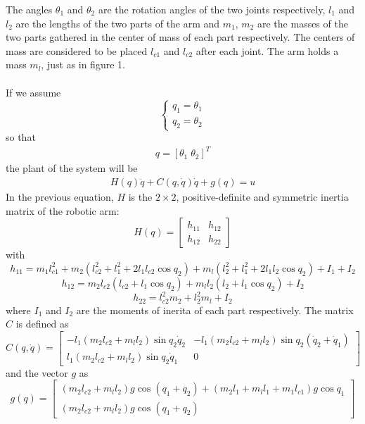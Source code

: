 \documentclass[a4paper]{article}
\newcommand\dotq{\dot{q}}
\newcommand\ddotq{\ddot{q}}
\begin{document}
\noindent\hspace{-2pt}
The angles $\theta_1$ and $\theta_2$ are the rotation angles of the two joints respectively, $l_1$ and $l_2$ are the 
lengths of the two parts of the arm and $m_1$, $m_2$ are the masses of the two parts gathered in the center of mass of 
each part respectively. The centers of mass are considered to be placed $l_{c1}$ and $l_{c2}$ after each joint. The arm 
holds a mass $m_l$, just as in figure 1. \\\\
If we assume 
$$
    \begin{cases}
        q_1 = \theta_1 \\ 
        q_2 = \theta_2
    \end{cases}
$$
so that 
\begin{align}
    q = [\theta_1 \; \theta_2]^T
\end{align}
the plant of the system will be 
\begin{align}
    H(q) \ddotq + C(q, \dotq) \dotq + g(q) = u
\end{align}
In the previous equation, $H$ is the $2 \times 2$, positive-definite and symmetric inertia matrix of the robotic arm: 
$$
    H(q) =  \begin{bmatrix}
            h_{11} & h_{12} \\
            h_{12} & h_{22}        
            \end{bmatrix}
$$
with 
$$h_{11} = m_{1} l_{c 1}^{2}+m_{2}\left(l_{c 2}^{2}+l_{1}^{2}+2 l_{1} l_{c 2} \cos q_{2}\right)+m_{l}\left(l_{2}^{2}+l_{1}^{2}+2 l_{1} l_{2} \cos q_{2}\right)+I_{1}+I_{2}$$
$$h_{12} = m_{2} l_{c 2}\left(l_{c 2}+l_{1} \cos q_{2}\right)+m_{l} l_{2}\left(l_{2}+l_{1} \cos q_{2}\right)+I_{2}$$
$$h_{22} = l_{c 2}^{2} m_{2}+l_{2}^{2} m_{l}+I_{2}$$
where $I_1$ and $I_2$ are the moments of inerita of each part respectively.
The matrix $C$ is defined as
$$C(q, \dotq) =     \begin{bmatrix}
                        -l_{1}\left(m_{2} l_{c 2}+m_{l} l_{2}\right) \sin q_{2} \dot{q}_{2} & -l_{1}\left(m_{2} l_{c 2}+m_{l} l_{2}\right) \sin q_{2}\left(\dot{q}_{2}+\dot{q}_{1}\right) \\
                        l_{1}\left(m_{2} l_{c 2}+m_{l} l_{2}\right) \sin q_{2} \dot{q}_{1} & 0
                    \end{bmatrix}
$$
and the vector $g$ as 
$$
    g(q) =  \begin{bmatrix}
                \left(m_{2} l_{c 2}+m_{l} l_{2}\right) g \cos \left(q_{1}+q_{2}\right)+\left(m_{2} l_{1}+m_{l} l_{1}+m_{1} l_{c 1}\right) g \cos q_{1} \\
                \left(m_{2} l_{c 2}+m_{l} l_{2}\right) g \cos \left(q_{1}+q_{2}\right)
            \end{bmatrix}
$$ \\
\end{document}
